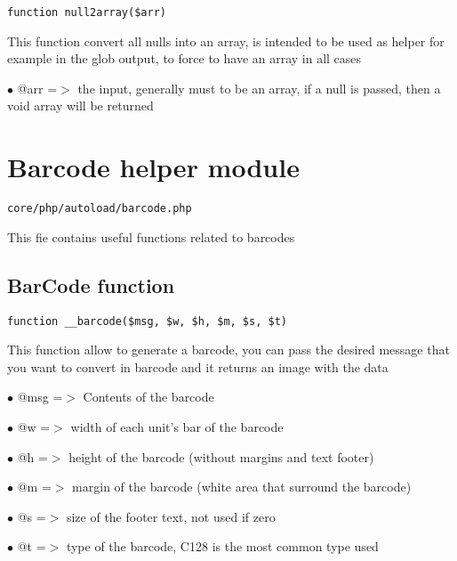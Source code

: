 \documentclass[a4paper]{book}
\begin{document}
\begin{lstlisting}
function null2array($arr)
\end{lstlisting}

This function convert all nulls into an array, is intended to be
used as helper for example in the glob output, to force to have
an array in all cases

\begin{compactitem}
\item[\color{myblue}$\bullet$] @arr =$>$ the input, generally must to be an array, if a null is passed,
        then a void array will be returned
\end{compactitem}

\hypertarget{toc38}{}
\section{Barcode helper module}

\begin{lstlisting}
core/php/autoload/barcode.php
\end{lstlisting}

This fie contains useful functions related to barcodes

\hypertarget{toc39}{}
\subsection{BarCode function}

\begin{lstlisting}
function __barcode($msg, $w, $h, $m, $s, $t)
\end{lstlisting}

This function allow to generate a barcode, you can pass the desired
message that you want to convert in barcode and it returns an image
with the data

\begin{compactitem}
\item[\color{myblue}$\bullet$] @msg =$>$ Contents of the barcode
\item[\color{myblue}$\bullet$] @w   =$>$ width of each unit's bar of the barcode
\item[\color{myblue}$\bullet$] @h   =$>$ height of the barcode (without margins and text footer)
\item[\color{myblue}$\bullet$] @m   =$>$ margin of the barcode (white area that surround the barcode)
\item[\color{myblue}$\bullet$] @s   =$>$ size of the footer text, not used if zero
\item[\color{myblue}$\bullet$] @t   =$>$ type of the barcode, C128 is the most common type used
\end{compactitem}
\end{document}
